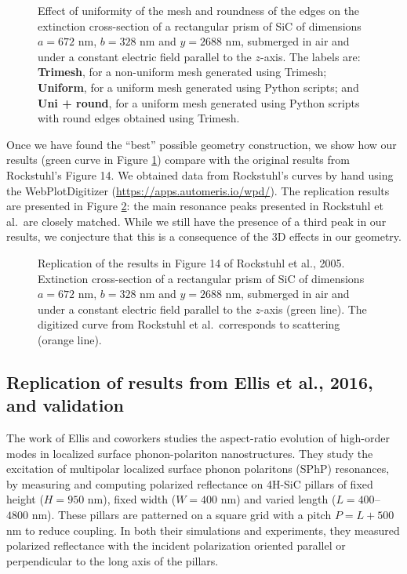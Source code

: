 \begin{figure}
    \centering
    \caption{Effect of uniformity of the mesh and roundness of the edges on the 
    extinction cross-section of a rectangular prism of SiC of dimensions $a=672$ nm, 
    $b=328$ nm and $y=2688$ nm, submerged in air and under a constant electric field 
    parallel to the $z$-axis. The labels are: \textbf{Trimesh}, for a non-uniform mesh generated using Trimesh; 
    \textbf{Uniform}, for a uniform mesh generated using Python scripts; and 
    \textbf{Uni + round}, for a uniform mesh generated using Python scripts with round 
    edges obtained using Trimesh.}
    \label{fig:tri_reg_round_14}
 \end{figure}

Once we have found the ``best'' possible geometry construction, we show how our results 
(green curve in Figure \ref{fig:tri_reg_round_14}) compare 
with the original results from Rockstuhl's Figure 14. We obtained data from Rockstuhl's curves by hand using 
the WebPlotDigitizer (\url{https://apps.automeris.io/wpd/}). The replication results are 
presented in Figure \ref{fig:rep_14}: the main resonance peaks presented in Rockstuhl et al.\ are 
closely matched. While we still have the presence of a third peak in our results, we conjecture 
that this is a consequence of the 3D effects in our geometry.

 \begin{figure}
    \centering
    \caption{Replication of the results in Figure 14 of Rockstuhl et al., 2005. Extinction cross-section of a
    rectangular prism of SiC of dimensions $a=672$ nm, $b=328$ nm and $y=2688$ nm, submerged
    in air and under a constant electric field parallel to the $z$-axis (green line). 
    The digitized curve from Rockstuhl et al.\ corresponds to scattering (orange line).}
    \label{fig:rep_14}
 \end{figure}


 \subsection{Replication of results from Ellis et al., 2016, and validation}\label{sec:replication2}

The work of Ellis and coworkers \cite{ellis2016} studies the aspect-ratio evolution of high-order
modes in localized surface phonon-polariton nanostructures. They study the
excitation of multipolar localized surface phonon polaritons (SPhP) resonances, by measuring
and computing polarized reflectance on 4H-SiC pillars of fixed height ($H=950$ nm), fixed 
width ($W=400$ nm) and varied length ($L=400$--$4800$ nm). These pillars are patterned on a square 
grid with a pitch $P=L+500$ nm to reduce coupling. In both their simulations and experiments, they 
measured polarized reflectance with the incident polarization 
oriented parallel or perpendicular to the long axis of the pillars.  

